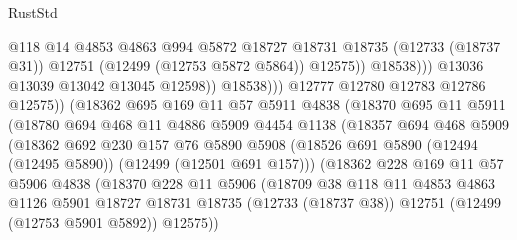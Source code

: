 \begin{lexlean}{RustStd}
\begin{coremodule}
{\begin{coremodule}
{{{{{{{{{{{{{{{{{{{{{{{{{{{{{{{{{{{{{{{{{{{{{{{{{{{{{{{{{{{{{{{{{{{{{{{{{{{{{{{{                                    @118
                                    @14
                                    @4853
                                    @4863
                                    @994
                                    @5872
                                    @18727
                                    @18731
                                    @18735
                                    (@12733 (@18737 @31))
                                    @12751
                                    (@12499 (@12753 @5872 @5864))
                                    @12575))
                                @18538)))
                          @13036
                          @13039
                          @13042
                          @13045
                          @12598))
                      @18538)))
                @12777
                @12780
                @12783
                @12786
                @12575))
            (@18362
              @695
              @169
              @11
              @57
              @5911
              @4838
              (@18370
                @695
                @11
                @5911
                (@18780
                  @694
                  @468
                  @11
                  @4886
                  @5909
                  @4454
                  @1138
                  (@18357
                    @694
                    @468
                    @5909
                    (@18362
                      @692
                      @230
                      @157
                      @76
                      @5890
                      @5908
                      (@18526 @691 @5890 (@12494 (@12495 @5890)) (@12499 (@12501 @691 @157)))
                      (@18362
                        @228
                        @169
                        @11
                        @57
                        @5906
                        @4838
                        (@18370
                          @228
                          @11
                          @5906
                          (@18709
                            @38
                            @118
                            @11
                            @4853
                            @4863
                            @1126
                            @5901
                            @18727
                            @18731
                            @18735
                            (@12733 (@18737 @38))
                            @12751
                            (@12499 (@12753 @5901 @5892))
                            @12575))
}}}}}}}}}}}}}}}}}}}}}}}}}}}}}}}}}}}}}}}}}}}}}}}}}}}}}}}}}}}}}}}}}}}}}}}}}}}}}}}}
\end{coremodule}}
\end{coremodule}
\end{lexlean}
